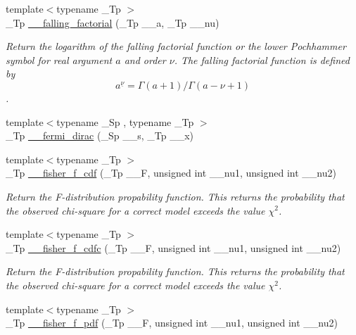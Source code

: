 \begin{DoxyCompactItemize}
{\footnotesize template$<$typename \+\_\+\+Tp $>$ }\\\+\_\+\+Tp \hyperlink{namespacestd_1_1____detail_a7cde2bf518e7ea3a0db2bec8f41b6465}{\+\_\+\+\_\+falling\+\_\+factorial} (\+\_\+\+Tp \+\_\+\+\_\+a, \+\_\+\+Tp \+\_\+\+\_\+nu)
\begin{DoxyCompactList}\small\item\em Return the logarithm of the falling factorial function or the lower Pochhammer symbol for real argument $ a $ and order $ \nu $. The falling factorial function is defined by \[ a^{\underline{\nu}} = \Gamma(a + 1) / \Gamma(a - \nu + 1) \]. \end{DoxyCompactList}\item 
{\footnotesize template$<$typename \+\_\+\+Sp , typename \+\_\+\+Tp $>$ }\\\+\_\+\+Tp \hyperlink{namespacestd_1_1____detail_a470e563c4e88c433f94dca391814dc61}{\+\_\+\+\_\+fermi\+\_\+dirac} (\+\_\+\+Sp \+\_\+\+\_\+s, \+\_\+\+Tp \+\_\+\+\_\+x)
\item 
{\footnotesize template$<$typename \+\_\+\+Tp $>$ }\\\+\_\+\+Tp \hyperlink{namespacestd_1_1____detail_a3825f4b63cdd255c1ca790bf16d844a1}{\+\_\+\+\_\+fisher\+\_\+f\+\_\+cdf} (\+\_\+\+Tp \+\_\+\+\_\+F, unsigned int \+\_\+\+\_\+nu1, unsigned int \+\_\+\+\_\+nu2)
\begin{DoxyCompactList}\small\item\em Return the F-\/distribution propability function. This returns the probability that the observed chi-\/square for a correct model exceeds the value $ \chi^2 $. \end{DoxyCompactList}\item 
{\footnotesize template$<$typename \+\_\+\+Tp $>$ }\\\+\_\+\+Tp \hyperlink{namespacestd_1_1____detail_ae02418cde6461a9e65f926c974c216a2}{\+\_\+\+\_\+fisher\+\_\+f\+\_\+cdfc} (\+\_\+\+Tp \+\_\+\+\_\+F, unsigned int \+\_\+\+\_\+nu1, unsigned int \+\_\+\+\_\+nu2)
\begin{DoxyCompactList}\small\item\em Return the F-\/distribution propability function. This returns the probability that the observed chi-\/square for a correct model exceeds the value $ \chi^2 $. \end{DoxyCompactList}\item 
{\footnotesize template$<$typename \+\_\+\+Tp $>$ }\\\+\_\+\+Tp \hyperlink{namespacestd_1_1____detail_a2f85415264800034e969f86ac8294f7b}{\+\_\+\+\_\+fisher\+\_\+f\+\_\+pdf} (\+\_\+\+Tp \+\_\+\+\_\+F, unsigned int \+\_\+\+\_\+nu1, unsigned int \+\_\+\+\_\+nu2)

\end{DoxyCompactItemize}
